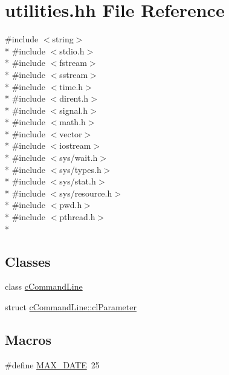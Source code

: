 \hypertarget{utilities_8hh}{}\section{utilities.\+hh File Reference}
\label{utilities_8hh}
{\ttfamily \#include $<$string$>$}\\*
{\ttfamily \#include $<$stdio.\+h$>$}\\*
{\ttfamily \#include $<$fstream$>$}\\*
{\ttfamily \#include $<$sstream$>$}\\*
{\ttfamily \#include $<$time.\+h$>$}\\*
{\ttfamily \#include $<$dirent.\+h$>$}\\*
{\ttfamily \#include $<$signal.\+h$>$}\\*
{\ttfamily \#include $<$math.\+h$>$}\\*
{\ttfamily \#include $<$vector$>$}\\*
{\ttfamily \#include $<$iostream$>$}\\*
{\ttfamily \#include $<$sys/wait.\+h$>$}\\*
{\ttfamily \#include $<$sys/types.\+h$>$}\\*
{\ttfamily \#include $<$sys/stat.\+h$>$}\\*
{\ttfamily \#include $<$sys/resource.\+h$>$}\\*
{\ttfamily \#include $<$pwd.\+h$>$}\\*
{\ttfamily \#include $<$pthread.\+h$>$}\\*
\subsection*{Classes}
\begin{DoxyCompactItemize}
\item 
class \hyperlink{classcCommandLine}{c\+Command\+Line}
\item 
struct \hyperlink{structcCommandLine_1_1clParameter}{c\+Command\+Line\+::cl\+Parameter}
\end{DoxyCompactItemize}
\subsection*{Macros}
\begin{DoxyCompactItemize}
\item 
\#define \hyperlink{utilities_8hh_ab2854f198e119d1843f14002a2621aa7}{M\+A\+X\+\_\+\+D\+A\+TE}~25
\end{DoxyCompactItemize}
